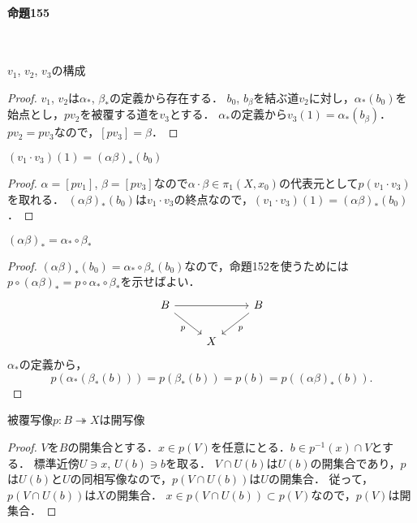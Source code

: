 \documentclass[a4paper, leqno]{ltjsreport}
\begin{document}
\paragraph{命題155}~
\begin{screen}
  \(v_1\), \(v_2\), \(v_3\)の構成
\end{screen}
\begin{proof}
  \(v_1\), \(v_2\)は\(\alpha_\ast\), \(\beta_\ast\)の定義から存在する．
  \(b_0\), \(b_\beta\)を結ぶ道\(v_2\)に対し，\(\alpha_\ast(b_0)\)を始点とし，\(pv_2\)を被覆する道を\(v_3\)とする．
  \(\alpha_\ast\)の定義から\(v_3(1) = \alpha_\ast(b_\beta)\)．
  \(pv_2 = pv_3\)なので，\([pv_3]=\beta\)．
\end{proof}

\begin{screen}
  \((v_1\cdot v_3)(1) = (\alpha\beta)_\ast(b_0)\)
\end{screen}
\begin{proof}
  \(\alpha=[pv_1]\), \(\beta=[pv_3]\)なので\(\alpha\cdot\beta \in \pi_1(X, x_0)\)の代表元として\(p(v_1\cdot v_3)\)を取れる．
  \( (\alpha\beta)_\ast(b_0)\)は\(v_1\cdot v_3\)の終点なので，\((v_1\cdot v_3)(1) = (\alpha\beta)_\ast(b_0)\)．
\end{proof}

\begin{screen}
  \((\alpha\beta)_\ast = \alpha_\ast\circ\beta_\ast\)
\end{screen}
\begin{proof}
  \((\alpha\beta)_\ast(b_0) = \alpha_\ast\circ\beta_\ast(b_0)\)なので，命題152を使うためには\(p\circ(\alpha\beta)_\ast = p\circ\alpha_\ast\circ\beta_\ast\)を示せばよい．
  \[
  \begin{tikzcd}
    B \arrow[rr]\arrow[rd, "p"'] & & B \arrow[ld, "p"] \\
    & X &
  \end{tikzcd}
  \]
  \(\alpha_\ast\)の定義から，
  \[
    p(\alpha_\ast(\beta_\ast(b))) = p(\beta_\ast(b)) = p(b) = p((\alpha\beta)_\ast(b)) .
  \]
\end{proof}

\begin{screen}
  被覆写像\(p\colon B\twoheadrightarrow X\)は開写像
\end{screen}
\begin{proof}
  \(V\)を\(B\)の開集合とする．\(x \in p(V)\)を任意にとる．\(b \in p^{-1}(x) \cap V\)とする．
  標準近傍\(U \ni x\), \(U(b) \ni b\)を取る．
  \(V \cap U(b)\)は\(U(b)\)の開集合であり，\(p\)は\(U(b)\)と\(U\)の同相写像なので，\(p(V\cap U(b))\)は\(U\)の開集合．
  従って，\(p(V\cap U(b))\)は\(X\)の開集合．
  \(x \in p(V\cap U(b)) \subset p(V)\)なので，\(p(V)\)は開集合．
\end{proof}
\end{document}
